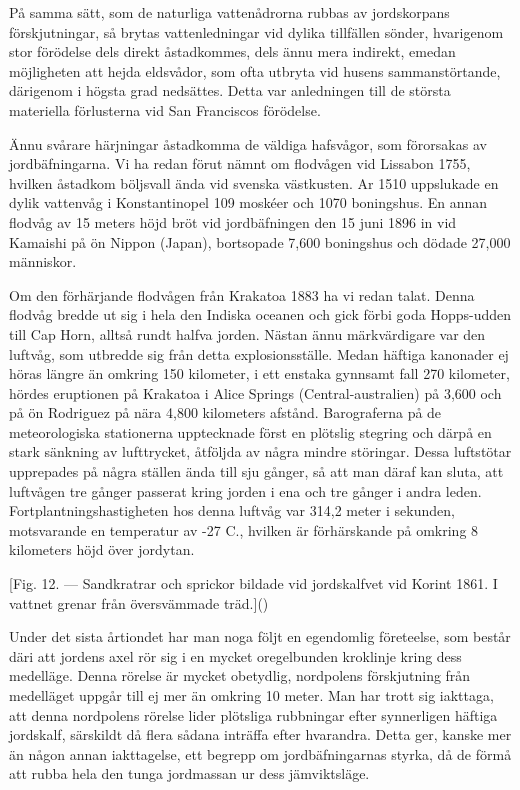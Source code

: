 \documentclass[a4paper, 12pt, oneside, swedish]{article}
\begin{document}
På samma sätt, som de naturliga vattenådrorna rubbas av jordskorpans förskjutningar, så brytas vattenledningar vid dylika tillfällen sönder, hvarigenom stor förödelse dels direkt åstadkommes, dels ännu mera indirekt, emedan möjligheten att hejda eldsvådor, som ofta utbryta vid husens sammanstörtande, därigenom i högsta grad nedsättes. Detta var anledningen till de största materiella förlusterna vid San Franciscos förödelse.

Ännu svårare härjningar åstadkomma de väldiga hafsvågor, som förorsakas av jordbäfningarna. Vi ha redan förut nämnt om flodvågen vid Lissabon 1755, hvilken åstadkom böljsvall ända vid svenska västkusten. Ar 1510 uppslukade en dylik vattenvåg i Konstantinopel 109 moskéer och 1070 boningshus. En annan flodvåg av 15 meters höjd bröt vid jordbäfningen den 15 juni 1896 in vid Kamaishi på ön Nippon (Japan), bortsopade 7,600 boningshus och dödade 27,000 människor.

Om den förhärjande flodvågen från Krakatoa 1883 ha vi redan talat. Denna flodvåg bredde ut sig i hela den Indiska oceanen och gick förbi goda Hopps-udden till Cap Horn, alltså rundt halfva jorden. Nästan ännu märkvärdigare var den luftvåg, som utbredde sig från detta explosionsställe. Medan häftiga kanonader ej höras längre än omkring 150 kilometer, i ett enstaka gynnsamt fall 270 kilometer, hördes eruptionen på Krakatoa i Alice Springs (Central-australien) på 3,600 och på ön Rodriguez på nära 4,800 kilometers afstånd. Barograferna på de meteorologiska stationerna upptecknade först en plötslig stegring och därpå en stark sänkning av lufttrycket, åtföljda av några mindre störingar. Dessa luftstötar upprepades på några ställen ända till sju gånger, så att man däraf kan sluta, att luftvågen tre gånger passerat kring jorden i ena och tre gånger i andra leden. Fortplantningshastigheten hos denna luftvåg var 314,2 meter i sekunden, motsvarande en temperatur av -27 C., hvilken är förhärskande på omkring 8 kilometers höjd över jordytan.

[Fig. 12. --- Sandkratrar och sprickor bildade vid jordskalfvet vid Korint 1861. I vattnet grenar från översvämmade träd.]()

Under det sista årtiondet har man noga följt en egendomlig företeelse, som består däri att jordens axel rör sig i en mycket oregelbunden kroklinje kring dess medelläge. Denna rörelse är mycket obetydlig, nordpolens förskjutning från medelläget uppgår till ej mer än omkring 10 meter. Man har trott sig iakttaga, att denna nordpolens rörelse lider plötsliga rubbningar efter synnerligen häftiga jordskalf, särskildt då flera sådana inträffa efter hvarandra. Detta ger, kanske mer än någon annan iakttagelse, ett begrepp om jordbäfningarnas styrka, då de förmå att rubba hela den tunga jordmassan ur dess jämviktsläge.
\end{document}
